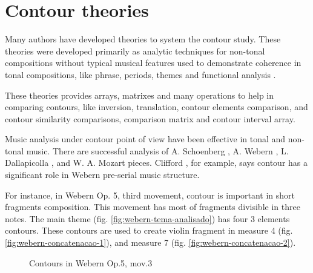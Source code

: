 \section{Contour theories}
\label{sec:contour-theories}

Many authors
\cite{friedmann85:methodology,friedmann87:response,morris87:composition,morris93:directions,marvin.ea87:relating,marvin88:generalized,marvin.ea95:generalization,polansky.ea92:possible,quinn97:fuzzy,clifford95:contour,beard03:contour}
have developed theories to system the contour study. These theories
were developed primarily as analytic techniques for non-tonal
compositions without typical musical features used to demonstrate
coherence in tonal compositions, like phrase, periods, themes and
functional analysis \cite{beard03:contour}.

These theories provides arrays, matrixes and many operations to help
in comparing contours, like inversion, translation, contour elements
comparison, and contour similarity comparisons, comparison matrix and
contour interval array.

Music analysis under contour point of view have been effective in
tonal and non-tonal music. There are successful analysis of A.
Schoenberg \cite{friedmann85:methodology}, A. Webern
\cite{clifford95:contour}, L. Dallapicolla
\cite{marvin88:generalized}, and W. A. Mozart \cite{beard03:contour}
pieces. Clifford \cite{clifford95:contour}, for example, says contour
has a significant role in Webern pre-serial music structure.

For instance, in Webern Op. 5, third movement, contour is important in
short fragments composition. This movement has most of fragments
divisible in three notes. The main theme
(fig. \ref{fig:webern-tema-analisado}) has four 3 elements
contours. These contours are used to create violin fragment in measure
4 (fig. \ref{fig:webern-concatenacao-1}), and measure 7
(fig. \ref{fig:webern-concatenacao-2}).

\begin{figure}[!p]
  \centering

  \quad
  \caption{Contours in Webern Op.5, mov.3}
  \label{fig:exemplos-webern}
\end{figure}

